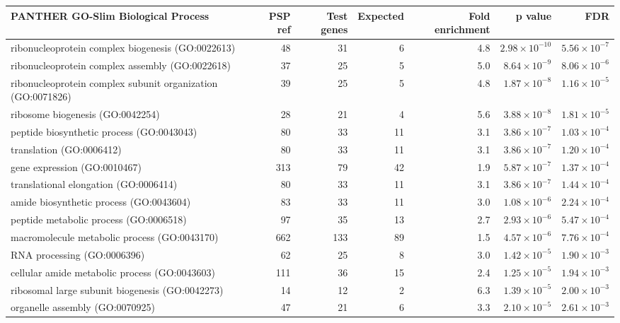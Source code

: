 \begin{table}[ht]
\centering
\begin{adjustbox}{width=\textwidth}
\begin{tabular}{lrrrrrr}
  \hline
PANTHER GO-Slim Biological Process & PSP ref & Test genes & Expected & Fold enrichment & p value & FDR \\ 
  \hline
ribonucleoprotein complex biogenesis (GO:0022613) & 48 & 31 & 6 & 4.8 & $2.98 \times 10^{-10}$ & $5.56 \times 10^{-7}$ \\ 
  ribonucleoprotein complex assembly (GO:0022618) & 37 & 25 & 5 & 5.0 & $8.64 \times 10^{-9}$ & $8.06 \times 10^{-6}$ \\ 
  ribonucleoprotein complex subunit organization (GO:0071826) & 39 & 25 & 5 & 4.8 & $1.87 \times 10^{-8}$ & $1.16 \times 10^{-5}$ \\ 
  ribosome biogenesis (GO:0042254) & 28 & 21 & 4 & 5.6 & $3.88 \times 10^{-8}$ & $1.81 \times 10^{-5}$ \\ 
  peptide biosynthetic process (GO:0043043) & 80 & 33 & 11 & 3.1 & $3.86 \times 10^{-7}$ & $1.03 \times 10^{-4}$ \\ 
  translation (GO:0006412) & 80 & 33 & 11 & 3.1 & $3.86 \times 10^{-7}$ & $1.20 \times 10^{-4}$ \\ 
  gene expression (GO:0010467) & 313 & 79 & 42 & 1.9 & $5.87 \times 10^{-7}$ & $1.37 \times 10^{-4}$ \\ 
  translational elongation (GO:0006414) & 80 & 33 & 11 & 3.1 & $3.86 \times 10^{-7}$ & $1.44 \times 10^{-4}$ \\ 
  amide biosynthetic process (GO:0043604) & 83 & 33 & 11 & 3.0 & $1.08 \times 10^{-6}$ & $2.24 \times 10^{-4}$ \\ 
  peptide metabolic process (GO:0006518) & 97 & 35 & 13 & 2.7 & $2.93 \times 10^{-6}$ & $5.47 \times 10^{-4}$ \\ 
  macromolecule metabolic process (GO:0043170) & 662 & 133 & 89 & 1.5 & $4.57 \times 10^{-6}$ & $7.76 \times 10^{-4}$ \\ 
  RNA processing (GO:0006396) & 62 & 25 & 8 & 3.0 & $1.42 \times 10^{-5}$ & $1.90 \times 10^{-3}$ \\ 
  cellular amide metabolic process (GO:0043603) & 111 & 36 & 15 & 2.4 & $1.25 \times 10^{-5}$ & $1.94 \times 10^{-3}$ \\ 
  ribosomal large subunit biogenesis (GO:0042273) & 14 & 12 & 2 & 6.3 & $1.39 \times 10^{-5}$ & $2.00 \times 10^{-3}$ \\ 
  organelle assembly (GO:0070925) & 47 & 21 & 6 & 3.3 & $2.10 \times 10^{-5}$ & $2.61 \times 10^{-3}$ \\ 

\end{tabular}
\end{adjustbox}
\end{table}

